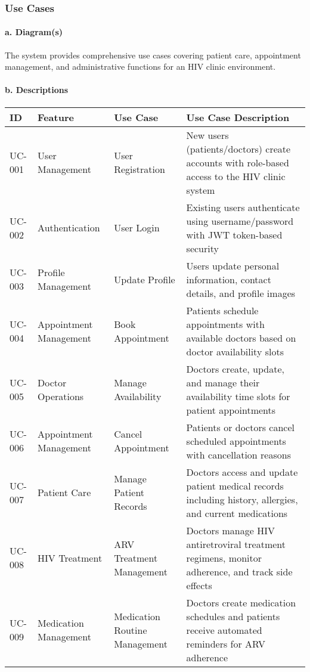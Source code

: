 \documentclass[12pt,a4paper]{article}
\begin{document}
\subsubsection{Use Cases}

\paragraph{a. Diagram(s)}
The system provides comprehensive use cases covering patient care, appointment management, and administrative functions for an HIV clinic environment.

\paragraph{b. Descriptions}

\begin{longtable}{|p{1cm}|p{3cm}|p{3cm}|p{7cm}|}
\hline
\textbf{ID} & \textbf{Feature} & \textbf{Use Case} & \textbf{Use Case Description} \\
\hline
UC-001 & User Management & User Registration & New users (patients/doctors) create accounts with role-based access to the HIV clinic system \\
\hline
UC-002 & Authentication & User Login & Existing users authenticate using username/password with JWT token-based security \\
\hline
UC-003 & Profile Management & Update Profile & Users update personal information, contact details, and profile images \\
\hline
UC-004 & Appointment Management & Book Appointment & Patients schedule appointments with available doctors based on doctor availability slots \\
\hline
UC-005 & Doctor Operations & Manage Availability & Doctors create, update, and manage their availability time slots for patient appointments \\
\hline
UC-006 & Appointment Management & Cancel Appointment & Patients or doctors cancel scheduled appointments with cancellation reasons \\
\hline
UC-007 & Patient Care & Manage Patient Records & Doctors access and update patient medical records including history, allergies, and current medications \\
\hline
UC-008 & HIV Treatment & ARV Treatment Management & Doctors manage HIV antiretroviral treatment regimens, monitor adherence, and track side effects \\
\hline
UC-009 & Medication Management & Medication Routine Management & Doctors create medication schedules and patients receive automated reminders for ARV adherence \\

\end{longtable}
\end{document}
